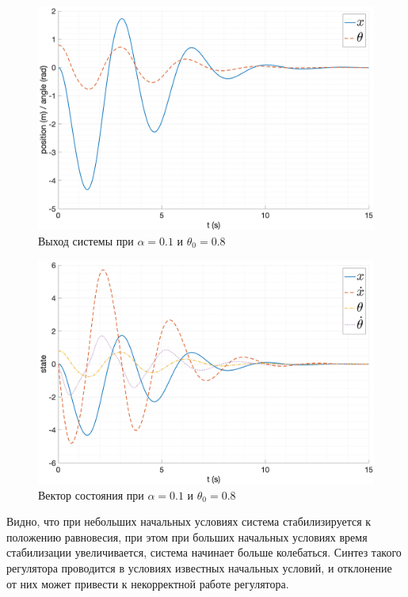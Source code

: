 \begin{figure}[ht!]
    \centering
    \includegraphics[width=\textwidth]{media/plots/nonmodal_controlers_min/out_3.png}
    \caption{Выход системы при $\alpha = 0.1$ и $\theta_0 = 0.8$}
    \label{fig:nonmodal_control_alpha_1_3}
\end{figure}
\begin{figure}[ht!]
    \centering
    \includegraphics[width=\textwidth]{media/plots/nonmodal_controlers_min/state_3.png}
    \caption{Вектор состояния при $\alpha = 0.1$ и $\theta_0 = 0.8$}
    \label{fig:nonmodal_control_alpha_1_3_state}
\end{figure}
\FloatBarrier
Видно, что при небольших начальных условиях система стабилизируется к положению равновесия,
при этом при больших начальных условиях время стабилизации увеличивается, система начинает
больше колебаться. 
Синтез такого регулятора проводится в условиях известных начальных условий, 
и отклонение от них может привести к некорректной работе регулятора. 

